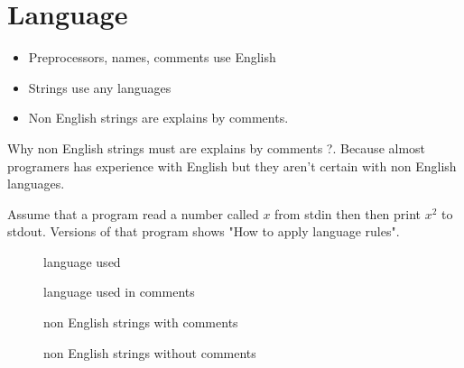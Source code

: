 \chapter{Language}


\begin{itemize}
\item
Preprocessors, names, comments \must{} use English
\item
Strings \can{} use any languages
\item
Non English strings \must{} are explains by comments.
\end{itemize}

Why non English strings must are explains by comments ?. Because almost
programers has experience with English but they aren't certain with
non English languages.

Assume that a program read a number called $x$ from stdin then then print $x^2$
to stdout. Versions of that program shows "How to apply language rules".

\begin{figure}
    \caption{\good{} language used}
    
\end{figure}

\begin{figure}
    \caption{\bad{} language used in comments}
    
\end{figure}

\begin{figure}
    \caption{\good{} non English strings with comments}
    
\end{figure}

\begin{figure}
    \caption{\bad{} non English strings without comments}
    
\end{figure}

